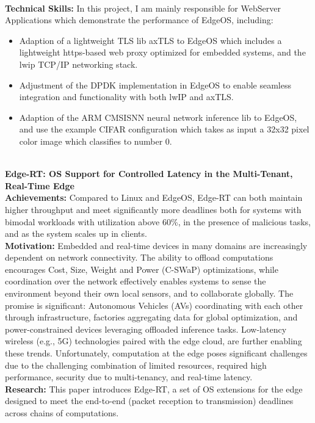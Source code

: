 \vspace{-1.0em}
\
\\
\textbf{\small Technical Skills:}
In this project, I am mainly responsible for WebServer Applications which demonstrate the performance of EdgeOS, including:
\begin{itemize}[leftmargin=*]
    \setlength\itemsep{-0.0em}
	\item Adaption of a lightweight TLS lib axTLS to EdgeOS which includes a lightweight https-based web proxy optimized for embedded systems, and the lwip TCP/IP networking stack.
	\item Adjustment of  the DPDK implementation in EdgeOS to enable seamless integration and functionality with both lwIP and axTLS.
	\item Adaption of the ARM CMSISNN neural network inference lib to EdgeOS, and use the example CIFAR\-10 configuration which takes as input a 32x32 pixel color image which classifies to number 0.
\end{itemize}
\vspace{-1.0em}
\
\\
\textbf{Edge-RT: OS Support for Controlled Latency in the Multi-Tenant, Real-Time Edge}
\\
\textbf{\small Achievements:}
Compared to Linux and EdgeOS, Edge-RT can both maintain higher throughput and meet significantly more deadlines both for systems with bimodal workloads with utilization above 60\%, in the presence of malicious tasks, and as the system scales up in clients.
\\
\textbf{\small Motivation:}
Embedded and real-time devices in many domains are increasingly dependent on network connectivity.
The ability to offload computations encourages Cost, Size, Weight and Power (C-SWaP) optimizations, while coordination over the network effectively enables systems to sense the environment beyond their own local sensors, and to collaborate globally.
The promise is significant: Autonomous Vehicles (AVs) coordinating with each other through infrastructure, factories aggregating data for global optimization, and power-constrained devices leveraging offloaded inference tasks.
Low-latency wireless (e.g., 5G) technologies paired with the edge cloud, are further enabling these trends.
Unfortunately, computation at the edge poses significant challenges due to the challenging combination of limited resources, required high performance, security due to multi-tenancy, and real-time latency.
\\
\textbf{\small Research:}
This paper introduces Edge-RT, a set of OS extensions for the edge designed to meet the end-to-end (packet reception to transmission) deadlines across chains of computations.
